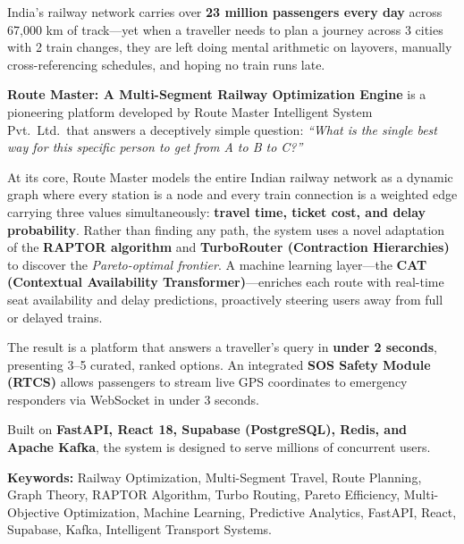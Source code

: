 \documentclass[12pt,a4paper]{report}
\begin{document}
\medskip

India's railway network carries over \textbf{23 million passengers every day} across 67,000 km of track---yet when a traveller needs to plan a journey across 3 cities with 2 train changes, they are left doing mental arithmetic on layovers, manually cross-referencing schedules, and hoping no train runs late.

\textbf{Route Master: A Multi-Segment Railway Optimization Engine} is a pioneering platform developed by Route Master Intelligent System Pvt.\ Ltd.\ that answers a deceptively simple question: \textit{``What is the single best way for this specific person to get from A to B to C?''}

At its core, Route Master models the entire Indian railway network as a dynamic graph where every station is a node and every train connection is a weighted edge carrying three values simultaneously: \textbf{travel time, ticket cost, and delay probability}. Rather than finding any path, the system uses a novel adaptation of the \textbf{RAPTOR algorithm} and \textbf{TurboRouter (Contraction Hierarchies)} to discover the \textit{Pareto-optimal frontier}. A machine learning layer---the \textbf{CAT (Contextual Availability Transformer)}---enriches each route with real-time seat availability and delay predictions, proactively steering users away from full or delayed trains.

The result is a platform that answers a traveller's query in \textbf{under 2 seconds}, presenting 3--5 curated, ranked options. An integrated \textbf{SOS Safety Module (RTCS)} allows passengers to stream live GPS coordinates to emergency responders via WebSocket in under 3 seconds.

Built on \textbf{FastAPI, React 18, Supabase (PostgreSQL), Redis, and Apache Kafka}, the system is designed to serve millions of concurrent users.

\vspace{0.5cm}

\textbf{Keywords:} Railway Optimization, Multi-Segment Travel, Route Planning, Graph Theory, RAPTOR Algorithm, Turbo Routing, Pareto Efficiency, Multi-Objective Optimization, Machine Learning, Predictive Analytics, FastAPI, React, Supabase, Kafka, Intelligent Transport Systems.

\tableofcontents

\listoffigures
\end{document}

